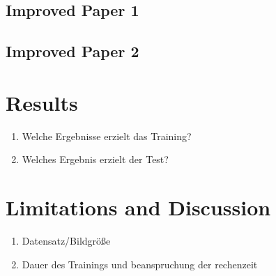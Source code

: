 \documentclass[fleqn,10pt]{SelfArx} %
\begin{document}
\subsection{Improved Paper 1}

\subsection{Improved Paper 2}



\section{Results}

\begin{enumerate}[noitemsep] %
	\item Welche Ergebnisse erzielt das Training?
	\item Welches Ergebnis erzielt der Test?
\end{enumerate}



\section{Limitations and Discussion}

\begin{enumerate}[noitemsep] %
	\item Datensatz/Bildgröße
	\item Dauer des Trainings und beanspruchung der rechenzeit
\end{enumerate}
\end{document}
